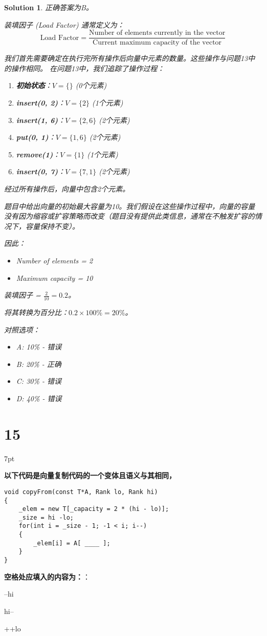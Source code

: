 \documentclass[UTF8]{report}
\newtheorem{solution}{Solution}
\theoremstyle{MyLineTheoremStyle} %
\theoremstyle{MyBlockTheoremStyle} %
\theoremstyle{MySubsubsectionStyle} %
\newenvironment{graybox}{%
        \def\FrameCommand{%
        \hspace{1pt}%
        {\color{gray}\small \vrule width 2pt}%
        {\color{graybox_color}\vrule width 4pt}%
        \colorbox{graybox_color}%
        }%
        \MakeFramed{\advance\hsize-\width\FrameRestore}%
        \noindent\hspace{-4.55pt}%
        \begin{adjustwidth}{}{7pt}%
        \vspace{2pt}\vspace{2pt}%
        }
        {%
        \vspace{2pt}\end{adjustwidth}\endMakeFramed%
        }
\begin{document}
\begin{solution}
正确答案为B。

装填因子 (Load Factor) 通常定义为：
$$ \text{Load Factor} = \frac{\text{Number of elements currently in the vector}}{\text{Current maximum capacity of the vector}} $$

我们首先需要确定在执行完所有操作后向量中元素的数量。这些操作与问题13中的操作相同。
在问题13中，我们追踪了操作过程：
\begin{enumerate}
    \item \textbf{初始状态}：$V = \{\}$ (0个元素)
    \item \textbf{insert(0, 2)}：$V = \{2\}$ (1个元素)
    \item \textbf{insert(1, 6)}：$V = \{2, 6\}$ (2个元素)
    \item \textbf{put(0, 1)}：$V = \{1, 6\}$ (2个元素)
    \item \textbf{remove(1)}：$V = \{1\}$ (1个元素)
    \item \textbf{insert(0, 7)}：$V = \{7, 1\}$ (2个元素)
\end{enumerate}
经过所有操作后，向量中包含2个元素。

题目中给出向量的初始最大容量为10。我们假设在这些操作过程中，向量的容量没有因为缩容或扩容策略而改变（题目没有提供此类信息，通常在不触发扩容的情况下，容量保持不变）。

因此：
\begin{itemize}
    \item Number of elements = 2
    \item Maximum capacity = 10
\end{itemize}
装填因子 = $\frac{2}{10} = 0.2$。

将其转换为百分比：$0.2 \times 100\% = 20\%$。

对照选项：
\begin{itemize}
    \item A: 10\% - 错误
    \item B: 20\% - 正确
    \item C: 30\% - 错误
    \item D: 40\% - 错误
\end{itemize}
\end{solution}

\section*{15}

\begin{graybox}
\textbf{以下代码是向量复制代码的一个变体且语义与其相同，}
\begin{verbatim}
void copyFrom(const T*A, Rank lo, Rank hi)
{
    _elem = new T[_capacity = 2 * (hi - lo)];
    _size = hi -lo;
    for(int i = _size - 1; -1 < i; i--)
    {
        _elem[i] = A[ ____ ];
    }
}
\end{verbatim}
\textbf{空格处应填入的内容为：}：
\begin{circledenum}
    \item --hi
    \item hi--
    \item ++lo
\end{circledenum}
\end{graybox}
\end{document}
